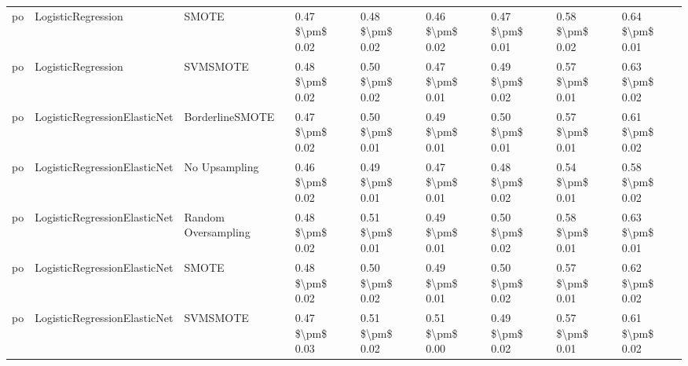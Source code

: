 \begin{tabular}{lllllllll}
      po &              LogisticRegression &                         SMOTE &     0.47 \$\textbackslash pm\$ 0.02 &           0.48 \$\textbackslash pm\$ 0.02 &       0.46 \$\textbackslash pm\$ 0.02 &        0.47 \$\textbackslash pm\$ 0.01 &                         0.58 \$\textbackslash pm\$ 0.02 &     0.64 \$\textbackslash pm\$ 0.01 \\
      po &              LogisticRegression &                      SVMSMOTE &     0.48 \$\textbackslash pm\$ 0.02 &           0.50 \$\textbackslash pm\$ 0.02 &       0.47 \$\textbackslash pm\$ 0.01 &        0.49 \$\textbackslash pm\$ 0.02 &                         0.57 \$\textbackslash pm\$ 0.01 &     0.63 \$\textbackslash pm\$ 0.02 \\
      po &    LogisticRegressionElasticNet &               BorderlineSMOTE &     0.47 \$\textbackslash pm\$ 0.02 &           0.50 \$\textbackslash pm\$ 0.01 &       0.49 \$\textbackslash pm\$ 0.01 &        0.50 \$\textbackslash pm\$ 0.01 &                         0.57 \$\textbackslash pm\$ 0.01 &     0.61 \$\textbackslash pm\$ 0.02 \\
      po &    LogisticRegressionElasticNet &                 No Upsampling &     0.46 \$\textbackslash pm\$ 0.02 &           0.49 \$\textbackslash pm\$ 0.01 &       0.47 \$\textbackslash pm\$ 0.01 &        0.48 \$\textbackslash pm\$ 0.02 &                         0.54 \$\textbackslash pm\$ 0.01 &     0.58 \$\textbackslash pm\$ 0.02 \\
      po &    LogisticRegressionElasticNet &           Random Oversampling &     0.48 \$\textbackslash pm\$ 0.02 &           0.51 \$\textbackslash pm\$ 0.01 &       0.49 \$\textbackslash pm\$ 0.01 &        0.50 \$\textbackslash pm\$ 0.02 &                         0.58 \$\textbackslash pm\$ 0.01 &     0.63 \$\textbackslash pm\$ 0.01 \\
      po &    LogisticRegressionElasticNet &                         SMOTE &     0.48 \$\textbackslash pm\$ 0.02 &           0.50 \$\textbackslash pm\$ 0.02 &       0.49 \$\textbackslash pm\$ 0.01 &        0.50 \$\textbackslash pm\$ 0.02 &                         0.57 \$\textbackslash pm\$ 0.01 &     0.62 \$\textbackslash pm\$ 0.02 \\
      po &    LogisticRegressionElasticNet &                      SVMSMOTE &     0.47 \$\textbackslash pm\$ 0.03 &           0.51 \$\textbackslash pm\$ 0.02 &       0.51 \$\textbackslash pm\$ 0.00 &        0.49 \$\textbackslash pm\$ 0.02 &                         0.57 \$\textbackslash pm\$ 0.01 &     0.61 \$\textbackslash pm\$ 0.02 \\

\end{tabular}
